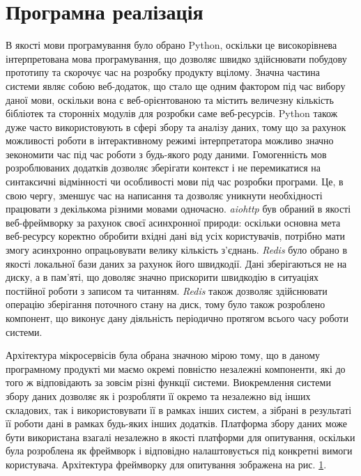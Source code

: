 \section{Програмна реалізація}
В якості мови програмування було обрано Python, оскільки це високорівнева інтерпретована мова програмування, що дозволяє швидко здійснювати побудову прототипу та скорочує час на розробку продукту вцілому. Значна частина системи являє собою веб-додаток, що стало ще одним фактором під час вибору даної мови, оскільки вона є веб-орієнтованою та містить величезну кількість бібліотек та сторонніх модулів для розробки саме веб-ресурсів. Python також дуже часто використовують в сфері збору та аналізу даних, тому що за рахунок можливості роботи в інтерактивному режимі інтерпретатора можливо значно зекономити час під час роботи з будь-якого роду даними. Гомогенність мов розроблюваних додатків дозволяє зберігати контекст і не перемикатися на синтаксичні відмінності чи особливості мови під час розробки програми. Це, в свою чергу, зменшує час на написання та дозволяє уникнути необхідності працювати з декількома різними мовами одночасно.
\textit{aiohttp} був обраний в якості веб-фреймворку за рахунок своєї асинхронної природи: оскільки основна мета веб-ресурсу коректно обробити вхідні дані від усіх користувачів, потрібно мати змогу асинхронно опрацьовувати велику кількість з'єднань. \textit{Redis} було обрано в якості локальної бази даних за рахунок його швидкодії. Дані зберігаються не на диску, а в пам'яті, що доволяє значно прискорити швидкодію в ситуаціях постійної роботи з записом та читанням. \textit{Redis} також дозволяє здійснювати операцію зберігання поточного стану на диск, тому було також розроблено компонент, що виконує дану діяльність періодично протягом всього часу роботи системи. 

Архітектура мікросервісів була обрана значною мірою тому, що в даному програмному продукті ми маємо окремі повністю незалежні компоненти, які до того ж відповідають за зовсім різні функції системи. Виокремлення системи збору даних дозволяє як і розробляти її окремо та незалежно від інших складових, так і використовувати її в рамках інших систем, а зібрані в результаті її роботи дані в рамках будь-яких інших додатків. Платформа збору даних може бути використана взагалі незалежно в якості платформи для опитування, оскільки була розроблена як фреймворк і відповідно налаштовується під конкретні вимоги користувача. Архітектура фреймворку для опитування зображена на рис. \ref{}.

